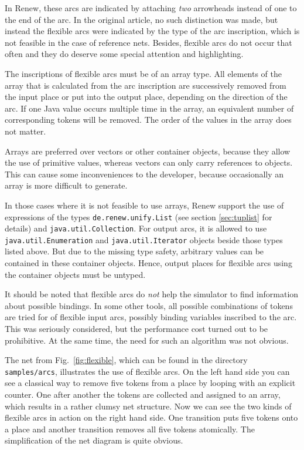 In Renew, these arcs are indicated by attaching \emph{two}
arrowheads instead of one to the end of the arc.
In the original article, no such distinction was made, but instead
the flexible arcs were indicated by the type of the arc inscription,
which is not feasible in the case of reference nets.
Besides, flexible arcs do not occur that often and they do
deserve some special attention and highlighting.

The inscriptions of flexible arcs must be of an array type.
All elements of the array that is calculated from the arc inscription
are successively removed from the input place or put into the
output place, depending on the direction of the arc.
If one Java value occurs multiple time in the array,
an equivalent number of corresponding tokens will be removed.
The order of the values in the array does not matter.

Arrays are preferred over vectors or other container objects,
because they allow the use
of primitive values, whereas vectors can only carry references
to objects. This can cause some inconveniences to the
developer, because occasionally an array is more difficult to
generate.

In those cases where it is not feasible to use arrays,
Renew support the use of expressions of the types
\texttt{de.renew.unify.List} (see section \ref{sec:tuplist}
for details) and \texttt{java.util.Collection}.
For output arcs, it is allowed to use
\texttt{java.util.Enumeration} and
\texttt{java.util.Iterator} objects beside those types listed above.
But due to the missing type safety, arbitrary values can be contained
in these container objects.
Hence, output places for flexible arcs using the
container objects must be untyped.

It should be noted that flexible arcs do \emph{not} help
the simulator to find information about possible bindings.
In some other tools, all possible combinations of tokens are
tried for of flexible input arcs, possibly binding
variables inscribed to the arc. This was seriously considered,
but the performance cost turned out to be
prohibitive. At the same time, the need for
such an algorithm was not obvious.


The net from Fig.~\ref{fig:flexible}, which can be found
in the directory \texttt{samples/arcs}, illustrates the use
of flexible arcs. On the left hand side you can see a
classical way to remove five tokens from a place by looping
with an explicit counter. One after another the tokens are collected
and assigned to an array, which results in a rather clumsy
net structure. Now we can see the two kinds of flexible arcs
in action on the right hand side. One transition puts
five tokens onto a place and another transition removes all
five tokens atomically.
The simplification of the net diagram is quite obvious.


